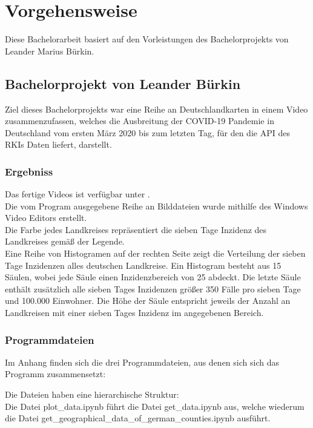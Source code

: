 \chapter{Vorgehensweise}\label{chap:Vorgehensweise}
Diese Bachelorarbeit basiert auf den Vorleistungen des Bachelorprojekts von Leander Marius Bürkin.

\section{Bachelorprojekt von Leander Bürkin}
Ziel dieses Bachelorprojekts war eine Reihe an Deutschlandkarten in einem Video zusammenzufassen, welches die Ausbreitung der COVID-19 Pandemie in Deutschland vom ersten März 2020 bis zum letzten Tag, für den die API des RKIs Daten liefert, darstellt.

\subsection{Ergebniss}
Das fertige Videos ist verfügbar unter .\\
Die vom Program ausgegebene Reihe an Bilddateien wurde mithilfe des Windows Video Editors erstellt.
\\
Die Farbe jedes Landkreises repräsentiert die sieben Tage Inzidenz des Landkreises gemäß der Legende.\\
Eine Reihe von Histogramen auf der rechten Seite zeigt die Verteilung der sieben Tage Inzidenzen alles deutschen Landkreise. Ein Histogram besteht aus 15 Säulen, wobei jede Säule einen Inzidenzbereich von 25 abdeckt. Die letzte Säule enthält zusätzlich alle sieben Tages Inzidenzen größer 350 Fälle pro sieben Tage und 100.000 Einwohner. Die Höhe der Säule entspricht jeweils der Anzahl an Landkreisen mit einer sieben Tages Inzidenz im angegebenen Bereich.

\subsection{Programmdateien}
Im Anhang finden sich die drei Programmdateien, aus denen sich sich das Programm zusammensetzt: 


Die Dateien haben eine hierarchische Struktur:\\
Die Datei \glqq{}plot\_data.ipynb\grqq{} führt die Datei \glqq{}get\_data.ipynb\grqq{} aus,
welche wiederum die Datei \glqq{}get\_geographical\_data\_of\_german\_counties.ipynb\grqq{} ausführt.

